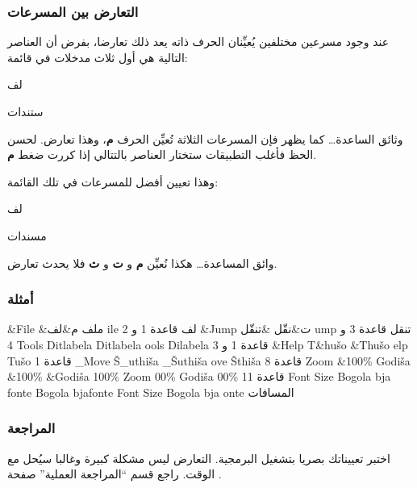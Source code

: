\subsubsection{التعارض بين المسرعات}
عند وجود مسرعين مختلفين يُعيِّنان الحرف ذاته يعد ذلك تعارضا، بفرض أن
العناصر التالية هي أول ثلاث مدخلات في قائمة:

\startitemize[1]
\item {}لف
\item {}ستندات
\item وثائق الساعدة…
\stopitemize
كما يظهر فإن المسرعات الثلاثة تُعيِّن الحرف {\bf م}، وهذا تعارض. لحسن
الحظ فأغلب التطبيقات ستختار العناصر بالتتالي إذا كررت ضغط {\bf م}.

وهذا تعيين أفضل للمسرعات في تلك القائمة:

\startitemize[1]
\item {}لف
\item مسندات
\item وائق المساعدة…
\stopitemize
هكذا نُعيِّن {\bf م} و {\bf ت} و {\bf ث} فلا يحدث تعارض.

\subsubsection{أمثلة}
\starttable[|l|l|l|l|l|l|]
\HL
\NC {} \NC {}
\NC {} \NC {} \NC
{} \NC {}\NC\AR
\HL
\NC \&File \NC \&ملف \NC م\&لف \NC {}ile \NC {}لف
\NC قاعدة 1 و 2\NC\AR
\HL
\NC \&Jump \NC ت\&نقّل \NC \&تنقّل \NC {}ump \NC تنقل \NC
قاعدة 3 و 4\NC\AR
\HL
\NC {} Tools  \NC Di tlabela \NC {}
Ditlabela \NC {}ools \NC Dilabela \NC قاعدة 1 و
3\NC\AR
\HL
\NC \&Help \NC T\&hušo \NC \&Thušo \NC {}elp \NC
Tušo \NC قاعدة 1\NC\AR
\HL
\NC \_Move \NC Š\_uthiša \NC \_Šuthiša \NC {}ove \NC
Šthiša \NC قاعدة 8\NC\AR
\HL
\NC Zoom \&100\% \NC Godiša \&100\% \NC \&Godiša 100\% \NC Zoom
00\% \NC Godiša 00\% \NC قاعدة 11\NC\AR
\HL
\NC {} Font Size \NC Bogola bja  fonte \NC Bogola
bja fonte \NC Font Size \NC Bogola bja onte \NC
المسافات\NC\AR
\HL
\stoptable
\subsubsection{المراجعة}
اختبر تعييناتك بصريا بتشغيل البرمجية. التعارض ليس مشكلة كبيرة وغالبا
سيُحل مع الوقت. راجع قسم “المراجعة العملية” صفحة
\at[ref:34365426].

